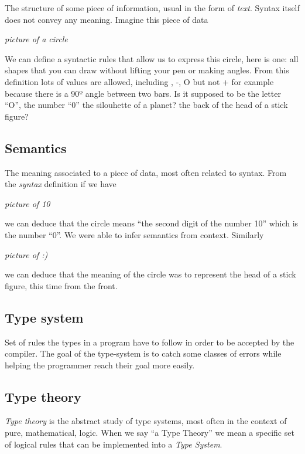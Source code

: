 \documentclass[
]{article}
\begin{document}
The structure of some piece of information, usual in the form of
\emph{text}. Syntax itself does not convey any meaning. Imagine this
piece of data

\emph{picture of a circle}

We can define a syntactic rules that allow us to express this circle,
here is one: all shapes that you can draw without lifting your pen or
making angles. From this definition lots of values are allowed,
including \textbar, -, O but not + for example because there is a 90º
angle between two bars. Is it supposed to be the letter ``O'', the
number ``0'' the silouhette of a planet? the back of the head of a stick
figure?

\hypertarget{semantics-1}{%
\subsection{Semantics}\label{semantics-1}}

The meaning associated to a piece of data, most often related to syntax.
From the \emph{syntax} definition if we have

\emph{picture of 10}

we can deduce that the circle means ``the second digit of the number
10'' which is the number ``0''. We were able to infer semantics from
context. Similarly

\emph{picture of :)}

we can deduce that the meaning of the circle was to represent the head
of a stick figure, this time from the front.

\hypertarget{type-system-1}{%
\subsection{Type system}\label{type-system-1}}

Set of rules the types in a program have to follow in order to be
accepted by the compiler. The goal of the type-system is to catch some
classes of errors while helping the programmer reach their goal more
easily.

\hypertarget{type-theory}{%
\subsection{Type theory}\label{type-theory}}

\emph{Type theory} is the abstract study of type systems, most often in
the context of pure, mathematical, logic. When we say ``a Type Theory''
we mean a specific set of logical rules that can be implemented into a
\emph{Type System}.
\end{document}
